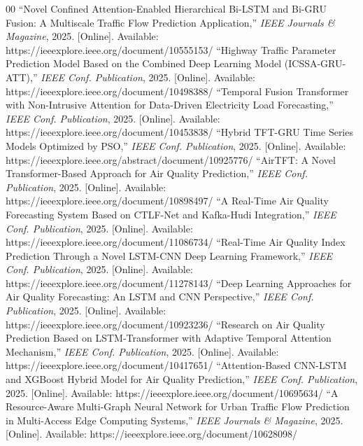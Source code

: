 \documentclass[conference]{IEEEtran}
\begin{document}
\begin{thebibliography}{00}
 ``Novel Confined Attention-Enabled Hierarchical Bi-LSTM and Bi-GRU Fusion: A Multiscale Traffic Flow Prediction Application,'' \textit{IEEE Journals \& Magazine}, 2025. [Online]. Available: https://ieeexplore.ieee.org/document/10555153/
 ``Highway Traffic Parameter Prediction Model Based on the Combined Deep Learning Model (ICSSA-GRU-ATT),'' \textit{IEEE Conf. Publication}, 2025. [Online]. Available: https://ieeexplore.ieee.org/document/10498388/
 ``Temporal Fusion Transformer with Non-Intrusive Attention for Data-Driven Electricity Load Forecasting,'' \textit{IEEE Conf. Publication}, 2025. [Online]. Available: https://ieeexplore.ieee.org/document/10453838/
 ``Hybrid TFT-GRU Time Series Models Optimized by PSO,'' \textit{IEEE Conf. Publication}, 2025. [Online]. Available: https://ieeexplore.ieee.org/abstract/document/10925776/
 ``AirTFT: A Novel Transformer-Based Approach for Air Quality Prediction,'' \textit{IEEE Conf. Publication}, 2025. [Online]. Available: https://ieeexplore.ieee.org/document/10898497/
 ``A Real-Time Air Quality Forecasting System Based on CTLF-Net and Kafka-Hudi Integration,'' \textit{IEEE Conf. Publication}, 2025. [Online]. Available: https://ieeexplore.ieee.org/document/11086734/
 ``Real-Time Air Quality Index Prediction Through a Novel LSTM-CNN Deep Learning Framework,'' \textit{IEEE Conf. Publication}, 2025. [Online]. Available: https://ieeexplore.ieee.org/document/11278143/
 ``Deep Learning Approaches for Air Quality Forecasting: An LSTM and CNN Perspective,'' \textit{IEEE Conf. Publication}, 2025. [Online]. Available: https://ieeexplore.ieee.org/document/10923236/
 ``Research on Air Quality Prediction Based on LSTM-Transformer with Adaptive Temporal Attention Mechanism,'' \textit{IEEE Conf. Publication}, 2025. [Online]. Available: https://ieeexplore.ieee.org/document/10417651/
 ``Attention-Based CNN-LSTM and XGBoost Hybrid Model for Air Quality Prediction,'' \textit{IEEE Conf. Publication}, 2025. [Online]. Available: https://ieeexplore.ieee.org/document/10695634/
 ``A Resource-Aware Multi-Graph Neural Network for Urban Traffic Flow Prediction in Multi-Access Edge Computing Systems,'' \textit{IEEE Journals \& Magazine}, 2025. [Online]. Available: https://ieeexplore.ieee.org/document/10628098/
\end{thebibliography}
\end{document}
